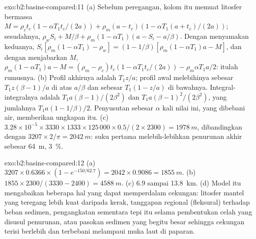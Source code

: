 \begin{solution}{exo:b2:basins-compared:11}
(a) Sebelum peregangan, kolom itu memuat litosfer bermassa $M = \rho_c t_c(1 - \alpha T_1
t_c/(2a)) + \rho_m(a - t_c)(1 - \alpha T_1(a + t_c)/(2a))$; sesudahnya, $\rho_w S_i + M/\beta +
\rho_m(1 - \alpha T_1)(a - S_i - a/\beta)$. Dengan menyamakan keduanya, $S_i[\rho_m(1 - \alpha T_1) - \rho_w] =
(1 - 1/\beta)[\rho_m(1 - \alpha T_1)a - M]$, dan dengan menjabarkan $M$, $\rho_m(1 - \alpha T_1)a - M =
(\rho_m - \rho_c)t_c(1 - \alpha T_1 t_c/(2a)) - \rho_m\alpha T_1 a/2$: itulah rumusnya. (b) Profil akhirnya adalah $T_1 z/a$; profil awal melebihinya
sebesar $T_1 z(\beta - 1)/a$ di atas $a/\beta$ dan sebesar $T_1(1 - z/a)$ di bawahnya. Integral-integralnya adalah $T_1
a(\beta - 1)/(2\beta^2)$ dan $T_1 a(\beta - 1)^2/(2\beta^2)$, yang jumlahnya $T_1 a(1 - 1/\beta)/2$.
Penyusutan sebesar $\alpha$ kali nilai ini, yang dibebani air, memberikan ungkapan itu. (c) $3.28\times10^{-5}
\times3330\times1333\times125\,000\times0.5/(2\times2300) = \qty{1978}{m}$, dibandingkan dengan $3207\times
2/\pi = \qty{2042}{m}$: suku pertama melebih-lebihkan penurunan akhir sebesar \qty{64}{m},
\qty{3}{\percent}.
\end{solution}

\begin{solution}{exo:b2:basins-compared:12}
(a) $3207\times0.6366\times(1 - e^{-150/62.7}) = 2042\times0.9086 = \qty{1855}{m}$. (b) $1855\times
2300/(3330 - 2400) = \qty{4588}{m}$. (c) 6.9 sampai \qty{13.8}{km}. (d) Model itu mengabaikan beberapa
hal yang dapat memperdalam cekungan: litosfer mantel yang teregang lebih kuat daripada kerak, tanggapan regional
(fleksural) terhadap beban sedimen, pengangkatan sementara tepi itu selama pembentukan celah
yang disusul penurunan, atau pasokan sedimen yang begitu besar sehingga cekungan terisi berlebih dan terbebani
melampaui muka laut di paparan.
\end{solution}

